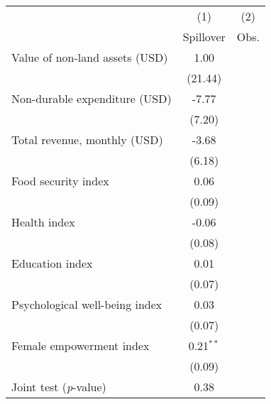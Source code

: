 {
\def\sym#1{\ifmmode^{#1}\else\(^{#1}\)\fi}
\begin{tabular}{l*{2}{c}}
\toprule
          &\multicolumn{1}{c}{(1)}&\multicolumn{1}{c}{(2)}\\
          &\multicolumn{1}{c}{Spillover}&\multicolumn{1}{c}{Obs.}\\
\midrule
\midrule Value of non-land assets (USD)&     1.00&         \\
          &  (21.44)&         \\
Non-durable expenditure (USD)&    -7.77&         \\
          &   (7.20)&         \\
Total revenue, monthly (USD)&    -3.68&         \\
          &   (6.18)&         \\
Food security index&     0.06&         \\
          &   (0.09)&         \\
Health index&    -0.06&         \\
          &   (0.08)&         \\
Education index&     0.01&         \\
          &   (0.07)&         \\
Psychological well-being index&     0.03&         \\
          &   (0.07)&         \\
Female empowerment index&0.21$^{**}$&         \\
          &   (0.09)&         \\
\midrule Joint test (\emph{p}-value)&     0.38&         \\
\bottomrule
\end{tabular}
}

